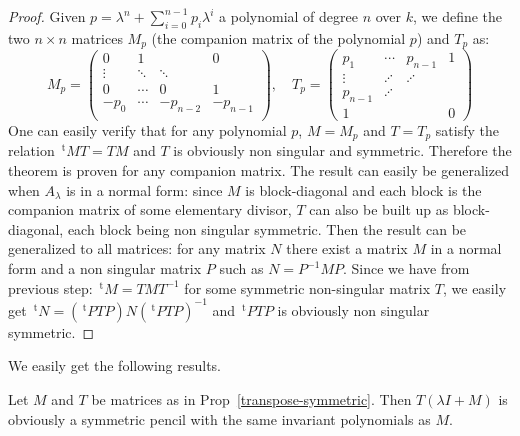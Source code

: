 \documentclass{lms}%
\def\transpose{\,{}^{\mathrm{t}\!}}
\begin{document}
\begin{proof}%
Given $p=\lambda^n+\sum_{i=0}^{n-1}{p_i\lambda^i}$ a polynomial of degree $n$ over $k$, we define the two 
$n\times n$ matrices $M_p$ (the companion matrix of the polynomial $p$) and $T_p$ as:
\begin{equation}
\label{eq:companion}
M_p = \begin{pmatrix}
0 & 1 & & 0\\
\vdots & \ddots & \ddots & \\
0 & \cdots & 0 & 1 \\
-p_0 & \cdots & -p_{n-2} & -p_{n-1}\\
%
\end{pmatrix}
, \quad T_p = \begin{pmatrix}
	p_1 & \cdots & p_{n-1} & 1 \\
	\vdots	& \iddots & \iddots & \\
	p_{n-1} & \iddots & & \\
	1 & & & 0
\end{pmatrix}
\end{equation}
One can easily verify that for any polynomial $p$, $M=M_p$ and $T=T_p$
satisfy the relation $\transpose{M}T = TM$ and $T$ is obviously non singular and symmetric. Therefore the theorem is proven for any companion matrix. The result can easily be generalized when $A_\lambda$ is in a normal form: since $M$ is block-diagonal and each block is the companion matrix of some elementary divisor, $T$ can also be built up as block-diagonal, each block being non singular symmetric. Then the result can be generalized to all matrices: for any matrix $N$ there exist a matrix $M$ in a normal form and a non singular matrix $P$ such as $N=P^{-1}MP$.  Since we have from previous step: $\transpose{M} = TMT^{-1}$ for some symmetric non-singular matrix $T$, we easily get $\transpose{N}=(\transpose{P}TP)N(\transpose{P}TP)^{-1}$ and $\transpose{P}TP$ is obviously non singular symmetric.
\end{proof}

We easily get the following results.

\begin{prop}
\label{cor:symmetric-similar-pencil}
Let $M$ and $T$ be matrices as in Prop~\ref{transpose-symmetric}. Then $T(\lambda I+M)$ is obviously a symmetric pencil with the same invariant polynomials as $M$.
\end{prop}
\fi
\end{document}
